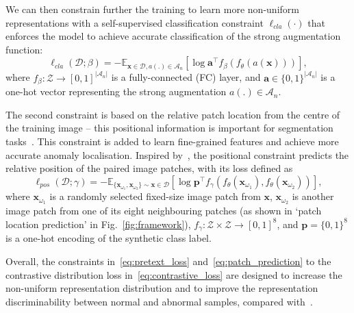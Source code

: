 \documentclass[runningheads]{llncs}
\begin{document}
We can then constrain further the training to learn more non-uniform representations with a self-supervised classification constraint $\ell_{cla}(\cdot)$ that enforces the model to achieve accurate classification of the strong augmentation function:
\begin{equation}
\ell_{cla}(\mathcal{D};\beta) = -\mathbb{E}_{\mathbf{x} \in \mathcal{D},  a(.) \in \mathcal{A}_n } \left [ \log \mathbf{a}^{\top} f_{\beta}(f_{\theta}(a(\mathbf{x}))) \right ],
\label{eq:pretext_loss}
\end{equation}
where $f_{\beta}:\mathcal{Z} \rightarrow [0,1]^{|\mathcal{A}_n|}$ is a fully-connected (FC) layer, and $\mathbf{a} \in \{0,1\}^{|\mathcal{A}_n|}$ is a one-hot vector representing the strong augmentation $a(.) \in \mathcal{A}_n$.

The second constraint is based on the relative patch location from the centre of the training image -- 
this positional information is important for segmentation tasks~\cite{noroozi2016unsupervised,DBLP:journals/corr/abs-1901-09005}. This constraint is added to learn fine-grained features and achieve more accurate anomaly localisation. Inspired by~\cite{doersch2015unsupervised}, the positional constraint predicts the relative position of the paired image patches, with its loss defined as 
\begin{equation}
\ell_{pos}(\mathcal{D};\gamma) = -\mathbb{E}_{ \{ \mathbf{x}_{\omega_{1}},\mathbf{x}_{\omega_{2}} \} \sim \mathbf{x} \in \mathcal{D}} \left [ \log \mathbf{p}^{\top} f_{\gamma}(f_{\theta}(\mathbf{x}_{\omega_{1}}),f_{\theta}(\mathbf{x}_{\omega_{2}})) \right ],
\label{eq:patch_prediction}
\end{equation}
where $\mathbf{x}_{\omega_{1}}$ is a randomly selected fixed-size image patch from $\mathbf{x}$, $\mathbf{x}_{\omega_{2}}$ is another image patch from one of its eight neighbouring patches (as shown in `patch location prediction' in Fig.~\ref{fig:framework}), $f_{\gamma}:\mathcal{Z}\times\mathcal{Z} \rightarrow [0,1]^8$, 
and $\mathbf{p} = \{0, 1\}^8$ is a one-hot encoding of the synthetic class label.


Overall, the constraints in~\eqref{eq:pretext_loss} and~\eqref{eq:patch_prediction} to the contrastive distribution loss in~\eqref{eq:contrastive_loss} are designed to increase the non-uniform representation distribution and to improve the representation discriminability between normal and abnormal samples, compared with~\cite{sohn2020learning}.
\end{document}
